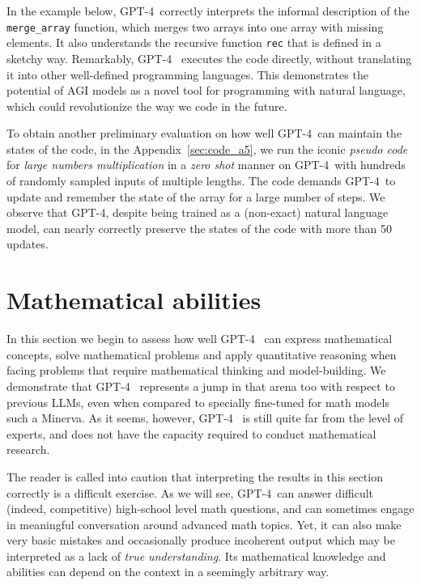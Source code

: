 In the example below, GPT-4\ correctly interprets the informal description of the \texttt{merge\_array} function, which merges two arrays into one array with missing elements. It also understands the recursive function \texttt{rec} that is defined in a sketchy way. Remarkably, GPT-4 \ executes the code directly, without translating it into other well-defined programming languages. This demonstrates the potential of AGI models as a novel tool for programming with natural language, which could revolutionize the way we code in the future.

To obtain another preliminary evaluation on how well GPT-4\ can maintain the states of the code, in the Appendix~\ref{sec:code_a5}, we run the iconic \textit{pseudo code} for \textit{large numbers multiplication} in a \textit{zero shot} manner on GPT-4\ with hundreds of randomly sampled inputs of multiple lengths. The code demands GPT-4\ to update and remember the state of the array for a large number of steps. We observe that GPT-4, despite being trained as a (non-exact) natural language model, can nearly correctly preserve the states of the code with more than 50 updates.

\section{Mathematical abilities}
\label{sec:math}

In this section we begin to assess how well GPT-4 \ can express mathematical concepts, solve mathematical problems and apply quantitative reasoning when facing problems that require mathematical thinking and model-building. We demonstrate that GPT-4 \ represents a jump in that arena too with respect to previous LLMs, even when compared to specially fine-tuned for math models such a Minerva. As it seems, however, GPT-4 \ is still quite far from the level of experts, and does not have the capacity required to conduct mathematical research. 

The reader is called into caution that interpreting the results in this section correctly is a difficult exercise. As we will see, GPT-4\ can answer difficult (indeed, competitive) high-school level math questions, and can sometimes engage in meaningful conversation around advanced math topics. Yet, it can also make very basic mistakes and occasionally produce incoherent output which may be interpreted as a lack of {\em true understanding}. Its mathematical knowledge and abilities can depend on the context in a seemingly arbitrary way. 

